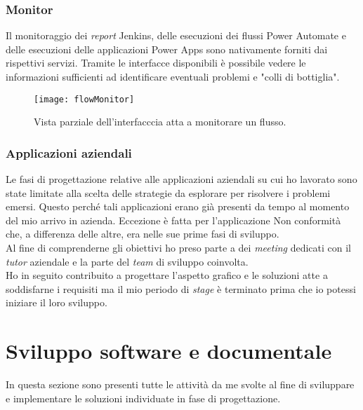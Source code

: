 \subsubsection*{Monitor}
Il monitoraggio dei \emph{report} Jenkins, delle esecuzioni dei flussi Power Automate e delle esecuzioni delle applicazioni Power Apps sono nativamente forniti dai rispettivi servizi. Tramite le interfacce disponibili è possibile vedere le informazioni sufficienti ad identificare eventuali problemi e "colli di bottiglia".
\begin{figure}[htbp] 
    \centering 
    \texttt{[image: flowMonitor]} 
    \caption{Vista parziale dell'interfacccia atta a monitorare un flusso.}
    \label{fig:flowMonitor}
\end{figure}

\newpage \subsubsection*{Applicazioni aziendali} 
Le fasi di progettazione relative alle applicazioni aziendali su cui ho lavorato sono state limitate alla scelta delle strategie da esplorare per risolvere i problemi emersi. Questo perché tali applicazioni erano già presenti da tempo al momento del mio arrivo in azienda.
Eccezione è fatta per l'applicazione Non conformità che, a differenza delle altre, era nelle sue prime fasi di sviluppo.\\
Al fine di comprenderne gli obiettivi ho preso parte a dei \emph{meeting} dedicati con il \emph{tutor} aziendale e la parte del \emph{team} di sviluppo coinvolta.\\ 
Ho in seguito contribuito a progettare l'aspetto grafico e le soluzioni atte a soddisfarne i requisiti ma il mio periodo di \emph{stage} è terminato prima che io potessi iniziare il loro sviluppo.  

\section{Sviluppo software e documentale}
In questa sezione sono presenti tutte le attività da me svolte al fine di sviluppare e implementare le soluzioni individuate in fase di progettazione.

